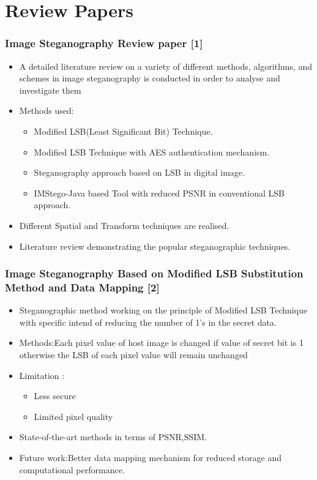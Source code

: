 \documentclass{beamer} %
\theoremstyle{definition} %
\begin{document}
\section{Review Papers}
\begin{frame}
\frametitle{Image Steganography Review paper [1]}
\begin{itemize}
	\item{ A detailed literature review on a
		variety of different methods, algorithms, and schemes in image steganography is conducted in order to analyse and
		investigate them
	}
   \item{Methods used:}
   \begin{itemize}
   	\item{Modified LSB(Least Significant Bit) Technique.}
   	\item{Modified LSB Technique with AES authentication mechanism.}
   	\item{Steganography approach based on LSB in digital image.}
   	\item{IMStego-Java based Tool with reduced PSNR in conventional LSB approach.}
   \end{itemize}
   \item{ Different Spatial and Transform techniques are realised.}
   \item{Literature review demonstrating the popular steganographic techniques.}
\end{itemize}
\end{frame}
\begin{frame}
\frametitle{Image Steganography Based on Modified LSB Substitution Method and Data Mapping [2]}
\begin{itemize}
	\item{Steganographic method working on the principle of Modified LSB Technique with specific intend of reducing the number of 1's in the secret data.}
	\item{Methods:Each pixel value of host image is changed if value of secret bit is 1 otherwise the LSB of each pixel value will remain unchanged }
	\item{Limitation :}
	   \begin{itemize}
	   	\item {Less secure}
	   	\item {Limited pixel quality}
	   \end{itemize}
    \item{State-of-the-art methods in terms of PSNR,SSIM.} 
	\item{Future work:Better data mapping mechanism for reduced storage and computational performance.}
\end{itemize}
\end{frame}
\end{document}
